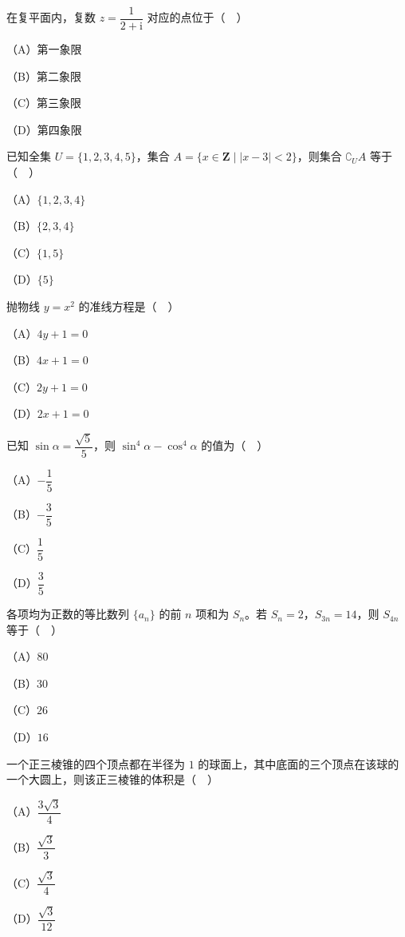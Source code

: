 


\begin{question}
在复平面内，复数 $z=\dfrac{1}{2+\mathrm i}$ 对应的点位于（　）

（A）第一象限

（B）第二象限

（C）第三象限

（D）第四象限

\end{question}
\begin{question}
已知全集 $U=\{1,2,3,4,5\}$，集合 $A=\{x\in\mathbf Z\mid |x-3|<2\}$，则集合 $\complement_UA$ 等于（　）

（A）$\{1,2,3,4\}$

（B）$\{2,3,4\}$

（C）$\{1,5\}$

（D）$\{5\}$

\end{question}
\begin{question}
抛物线 $y=x^2$ 的准线方程是（　）

（A）$4y+1=0$

（B）$4x+1=0$

（C）$2y+1=0$

（D）$2x+1=0$

\end{question}
\begin{question}
已知 $\sin\alpha=\dfrac{\sqrt5}{5}$，则 $\sin^4\alpha-\cos^4\alpha$ 的值为（　）

（A）$-\dfrac15$

（B）$-\dfrac35$

（C）$\dfrac15$

（D）$\dfrac35$

\end{question}
\begin{question}
各项均为正数的等比数列 $\{a_n\}$ 的前 $n$ 项和为 $S_n$。若 $S_n=2$，$S_{3n}=14$，则 $S_{4n}$ 等于（　）

（A）$80$

（B）$30$

（C）$26$

（D）$16$

\end{question}
\begin{question}
一个正三棱锥的四个顶点都在半径为 $1$ 的球面上，其中底面的三个顶点在该球的一个大圆上，则该正三棱锥的体积是（　）

（A）$\dfrac{3\sqrt3}{4}$

（B）$\dfrac{\sqrt3}{3}$

（C）$\dfrac{\sqrt3}{4}$

（D）$\dfrac{\sqrt3}{12}$

\end{question}
